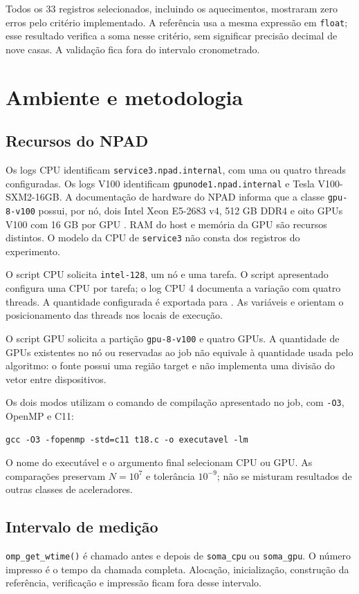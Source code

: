 \documentclass[12pt,a4paper]{article}
\begin{document}
Todos os 33 registros selecionados, incluindo os aquecimentos, mostraram zero erros pelo critério implementado. A referência usa a mesma expressão em \texttt{float}; esse resultado verifica a soma nesse critério, sem significar precisão decimal de nove casas. A validação fica fora do intervalo cronometrado.

\section{Ambiente e metodologia}
\subsection{Recursos do NPAD}
Os logs CPU identificam \texttt{service3.npad.internal}, com uma ou quatro threads configuradas. Os logs V100 identificam \texttt{gpunode1.npad.internal} e Tesla V100-SXM2-16GB. A documentação de hardware do NPAD informa que a classe \texttt{gpu-8-v100} possui, por nó, dois Intel Xeon E5-2683 v4, 512 GB DDR4 e oito GPUs V100 com 16 GB por GPU \cite{hardware}. RAM do host e memória da GPU são recursos distintos. O modelo da CPU de \texttt{service3} não consta dos registros do experimento.

O script CPU solicita \texttt{intel-128}, um nó e uma tarefa. O script apresentado configura uma CPU por tarefa; o log CPU 4 documenta a variação com quatro threads. A quantidade configurada é exportada para . As variáveis  e  orientam o posicionamento das threads nos locais de execução.

O script GPU solicita a partição \texttt{gpu-8-v100} e quatro GPUs. A quantidade de GPUs existentes no nó ou reservadas ao job não equivale à quantidade usada pelo algoritmo: o fonte possui uma região target e não implementa uma divisão do vetor entre dispositivos.



Os dois modos utilizam o comando de compilação apresentado no job, com \texttt{-O3}, OpenMP e C11:
\begin{lstlisting}[style=Terminal]
gcc -O3 -fopenmp -std=c11 t18.c -o executavel -lm
\end{lstlisting}
O nome do executável e o argumento final selecionam CPU ou GPU. As comparações preservam $N=10^7$ e tolerância $10^{-9}$; não se misturam resultados de outras classes de aceleradores.

\subsection{Intervalo de medição}
\texttt{omp\_get\_wtime()} é chamado antes e depois de \texttt{soma\_cpu} ou \texttt{soma\_gpu}. O número impresso é o tempo da chamada completa. Alocação, inicialização, construção da referência, verificação e impressão ficam fora desse intervalo.
\end{document}
